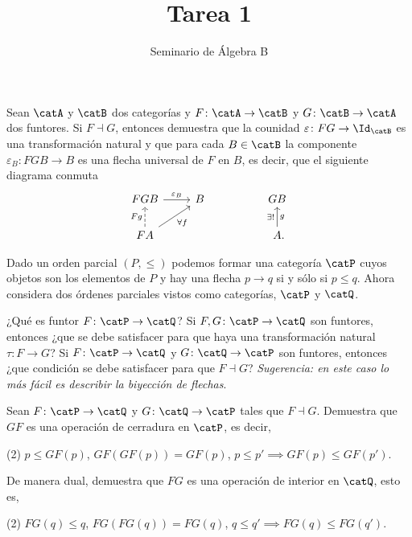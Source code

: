 \documentclass[article]{memoir}
\title{Tarea 1}
\author{Seminario de Álgebra B}
\date{}
\begin{document}
\maketitle

\begin{exercise}
Sean \(\catA\) y \(\catB\) dos categorías y \(F\colon\catA\to\catB\) y \(G\colon\catB\to\catA\) dos funtores. Si 
\(F\dashv G\), entonces demuestra que la counidad \(\varepsilon\colon FG\to \Id_{\catB}\) es una transformación natural y que para cada \(B\in\catB\) la componente \(\varepsilon_B\colon FGB\to B\) es una flecha universal de \(F\) en \(B\), es decir, que el siguiente diagrama conmuta
\[
  \begin{tikzcd}[ampersand replacement=\&]
    FGB\ar{r}{\varepsilon_B} \& B \&\& GB\\
    FA\ar{ru}[swap]{\forall f}\ar[dashed]{u}{Fg} \&\&\& A\mathrlap{.}\ar{u}{\exists !}[swap]{g}
  \end{tikzcd}
\]
\end{exercise}

\begin{exercise}
  Dado un orden parcial \((P,\leq)\) podemos formar una categoría \(\catP\) cuyos objetos son los elementos de \(P\) y hay una flecha \(p\to q\) si y sólo si \(p\leq q\). Ahora considera dos órdenes parciales vistos como categorías, \(\catP\) y \(\catQ\).
  \begin{tasks}
    \task ¿Qué es funtor \(F\colon\catP\to\catQ\)?
    \task Si \(F,G\colon\catP\to\catQ\) son funtores, entonces ¿que se debe satisfacer para que haya una transformación natural \(\tau\colon F\to G\)?
    \task Si \(F\colon\catP\to\catQ\) y \(G\colon\catQ\to\catP\) son funtores, entonces ¿que condición se debe satisfacer para que \(F\dashv G\)? \textit{Sugerencia: en este caso lo más fácil es describir la biyección de flechas}.
  \end{tasks}
\end{exercise}

\begin{exercise}%
\label{ej:cerr-int}
  Sean \(F\colon\catP\to\catQ\) y \(G\colon\catQ\to\catP\) tales que \(F\dashv G\). Demuestra que \(GF\) es una operación de cerradura en \(\catP\), es decir,
  \begin{tasks}(2)
    \task \(p\leq GF(p)\),
    \task \(GF(GF(p))=GF(p)\),
    \task \(p\leq p' \implies GF(p)\leq GF(p')\).
  \end{tasks}
  De manera dual, demuestra que \(FG\) es una operación de interior en \(\catQ\), esto es,
  \begin{tasks}[resume](2)
    \task \(FG(q)\leq q\),
    \task \(FG(FG(q))=FG(q)\),
    \task \(q\leq q' \implies FG(q)\leq FG(q')\).
  \end{tasks}
\end{exercise}
\end{document}
